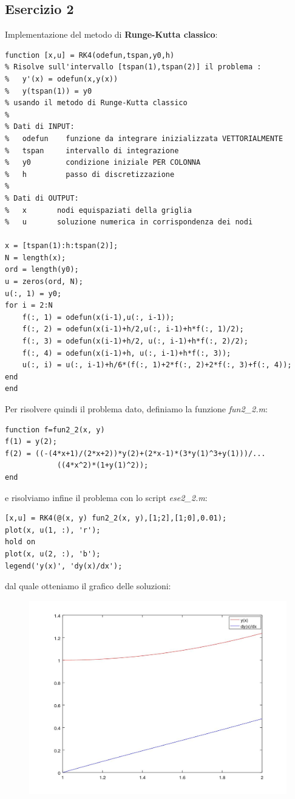 \documentclass[11pt,a4paper,twoside,openright,titlepage,
headinclude,footinclude,BCOR5mm,
numbers=noenddot,cleardoublepage=empty,
tablecaptionabove]{scrbook}
\begin{document}
\subsection{Esercizio 2}
Implementazione del metodo di \textbf{Runge-Kutta classico}:
\begin{lstlisting}[frame=trBL]
function [x,u] = RK4(odefun,tspan,y0,h)
% Risolve sull'intervallo [tspan(1),tspan(2)] il problema :
%   y'(x) = odefun(x,y(x))
%   y(tspan(1)) = y0
% usando il metodo di Runge-Kutta classico
%
% Dati di INPUT:
%   odefun    funzione da integrare inizializzata VETTORIALMENTE
%   tspan     intervallo di integrazione
%   y0        condizione iniziale PER COLONNA
%   h         passo di discretizzazione
%
% Dati di OUTPUT:
%   x       nodi equispaziati della griglia
%   u       soluzione numerica in corrispondenza dei nodi

x = [tspan(1):h:tspan(2)];
N = length(x);
ord = length(y0);
u = zeros(ord, N);  
u(:, 1) = y0;
for i = 2:N
    f(:, 1) = odefun(x(i-1),u(:, i-1));
    f(:, 2) = odefun(x(i-1)+h/2,u(:, i-1)+h*f(:, 1)/2);
    f(:, 3) = odefun(x(i-1)+h/2, u(:, i-1)+h*f(:, 2)/2);
    f(:, 4) = odefun(x(i-1)+h, u(:, i-1)+h*f(:, 3));
    u(:, i) = u(:, i-1)+h/6*(f(:, 1)+2*f(:, 2)+2*f(:, 3)+f(:, 4));
end
end
\end{lstlisting}
Per risolvere quindi il problema dato, definiamo la funzione \emph{fun2\_2.m}:
\begin{lstlisting}[frame = lines]
function f=fun2_2(x, y)
f(1) = y(2);
f(2) = ((-(4*x+1)/(2*x+2))*y(2)+(2*x-1)*(3*y(1)^3+y(1)))/...
            ((4*x^2)*(1+y(1)^2));
end
\end{lstlisting}
e risolviamo infine il problema con lo script \emph{ese2\_2.m}:
\begin{lstlisting}[frame=trBL]
[x,u] = RK4(@(x, y) fun2_2(x, y),[1;2],[1;0],0.01);
plot(x, u(1, :), 'r');
hold on
plot(x, u(2, :), 'b');
legend('y(x)', 'dy(x)/dx');
\end{lstlisting}
dal quale otteniamo il grafico delle soluzioni:
\begin{figure}[h!]
\centering
\includegraphics[width=\textwidth]{figs/ese2_2.jpg}
\end{figure}
\end{document}
